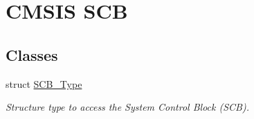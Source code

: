 \hypertarget{group___c_m_s_i_s___s_c_b}{\section{C\-M\-S\-I\-S S\-C\-B}
\label{group___c_m_s_i_s___s_c_b}
}
\subsection*{Classes}
\begin{DoxyCompactItemize}
\item 
struct \hyperlink{struct_s_c_b___type}{S\-C\-B\-\_\-\-Type}
\begin{DoxyCompactList}\small\item\em Structure type to access the System Control Block (S\-C\-B). \end{DoxyCompactList}\end{DoxyCompactItemize}
